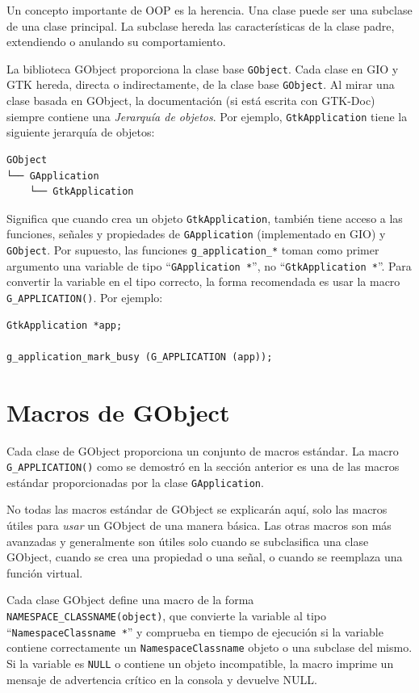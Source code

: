 Un concepto importante de OOP es la herencia. Una clase puede ser una subclase de una clase principal. La subclase hereda las características de la clase padre, extendiendo o anulando su comportamiento.

La biblioteca GObject proporciona la clase base \lstinline{GObject}. Cada clase en GIO y GTK hereda, directa o indirectamente, de la clase base \lstinline{GObject}. Al mirar una clase basada en GObject, la documentación (si está escrita con GTK-Doc) siempre contiene una \emph{Jerarquía de objetos}. Por ejemplo, \lstinline{GtkApplication} tiene la siguiente jerarquía de objetos:

\begin{verbatim}
GObject
└── GApplication
    └── GtkApplication
\end{verbatim}

Significa que cuando crea un objeto \lstinline{GtkApplication}, también tiene acceso a las funciones, señales y propiedades de \lstinline{GApplication} (implementado en GIO) y \lstinline{GObject}. Por supuesto, las funciones \lstinline{g_application_*} toman como primer argumento una variable de tipo ``\lstinline{GApplication *}'', no ``\lstinline{GtkApplication *}''. Para convertir la variable en el tipo correcto, la forma recomendada es usar la macro \lstinline{G_APPLICATION()}. Por ejemplo:

\begin{lstlisting}[style=GLib/GTK]
GtkApplication *app;

g_application_mark_busy (G_APPLICATION (app));
\end{lstlisting}

\section{Macros de GObject}

Cada clase de GObject proporciona un conjunto de macros estándar. La macro \lstinline{G_APPLICATION()} como se demostró en la sección anterior es una de las macros estándar proporcionadas por la clase \lstinline{GApplication}.

No todas las macros estándar de GObject se explicarán aquí, solo las macros útiles para \emph{usar} un GObject de una manera básica. Las otras macros son más avanzadas y generalmente son útiles solo cuando se subclasifica una clase GObject, cuando se crea una propiedad o una señal, o cuando se reemplaza una función virtual.

Cada clase GObject define una macro de la forma \lstinline{NAMESPACE_CLASSNAME(object)}, que convierte la variable al tipo ``\lstinline{NamespaceClassname *}'' y comprueba en tiempo de ejecución si la variable contiene correctamente un \lstinline{NamespaceClassname} objeto o una subclase del mismo. Si la variable es \lstinline{NULL} o contiene un objeto incompatible, la macro imprime un mensaje de advertencia crítico en la consola y devuelve NULL.

